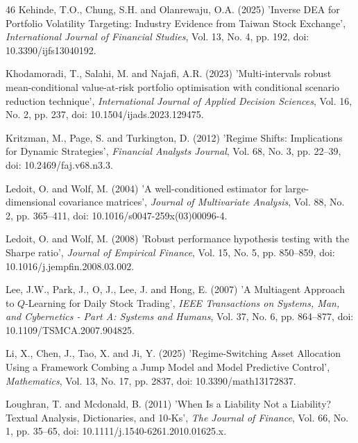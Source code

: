 \documentclass{singlecol-new}
\theoremstyle{TH}{
\newtheorem{lemma}{Lemma}
\newtheorem{theorem}[lemma]{Theorem}
\newtheorem{corrolary}[lemma]{Corrolary}
\newtheorem{conjecture}[lemma]{Conjecture}
\newtheorem{proposition}[lemma]{Proposition}
\newtheorem{claim}[lemma]{Claim}
\newtheorem{stheorem}[lemma]{Wrong Theorem}
\newtheorem{algorithm}{Algorithm}
}
\theoremstyle{THrm}{
\newtheorem{definition}{Definition}[section]
\newtheorem{question}{Question}[section]
\newtheorem{remark}{Remark}
\newtheorem{scheme}{Scheme}
}
\theoremstyle{THhit}{
\newtheorem{case}{Case}[section]
}
\begin{document}
\begin{thebibliography}{46}
Kehinde, T.O., Chung, S.H. and Olanrewaju, O.A. (2025) 'Inverse DEA for Portfolio Volatility Targeting: Industry Evidence from Taiwan Stock Exchange', {\it International Journal of Financial Studies}, Vol. 13, No. 4, pp. 192, doi: 10.3390/ijfs13040192.

Khodamoradi, T., Salahi, M. and Najafi, A.R. (2023) 'Multi-intervals robust mean-conditional value-at-risk portfolio optimisation with conditional scenario reduction technique', {\it International Journal of Applied Decision Sciences}, Vol. 16, No. 2, pp. 237, doi: 10.1504/ijads.2023.129475.

Kritzman, M., Page, S. and Turkington, D. (2012) 'Regime Shifts: Implications for Dynamic Strategies', {\it Financial Analysts Journal}, Vol. 68, No. 3, pp. 22--39, doi: 10.2469/faj.v68.n3.3.

Ledoit, O. and Wolf, M. (2004) 'A well-conditioned estimator for large-dimensional covariance matrices', {\it Journal of Multivariate Analysis}, Vol. 88, No. 2, pp. 365--411, doi: 10.1016/s0047-259x(03)00096-4.

Ledoit, O. and Wolf, M. (2008) 'Robust performance hypothesis testing with the Sharpe ratio', {\it Journal of Empirical Finance}, Vol. 15, No. 5, pp. 850--859, doi: 10.1016/j.jempfin.2008.03.002.

Lee, J.W., Park, J., O, J., Lee, J. and Hong, E. (2007) 'A Multiagent Approach to $Q$-Learning for Daily Stock Trading', {\it IEEE Transactions on Systems, Man, and Cybernetics - Part A: Systems and Humans}, Vol. 37, No. 6, pp. 864--877, doi: 10.1109/TSMCA.2007.904825.

Li, X., Chen, J., Tao, X. and Ji, Y. (2025) 'Regime-Switching Asset Allocation Using a Framework Combing a Jump Model and Model Predictive Control', {\it Mathematics}, Vol. 13, No. 17, pp. 2837, doi: 10.3390/math13172837.

Loughran, T. and Mcdonald, B. (2011) 'When Is a Liability Not a Liability? Textual Analysis, Dictionaries, and 10‐Ks', {\it The Journal of Finance}, Vol. 66, No. 1, pp. 35--65, doi: 10.1111/j.1540-6261.2010.01625.x.


\end{thebibliography}
\end{document}
